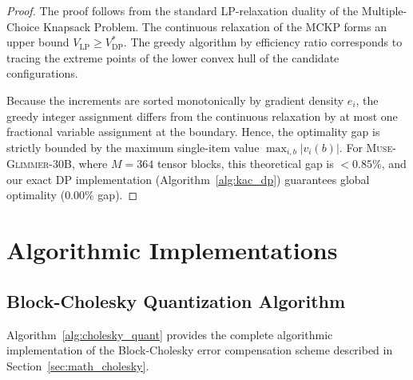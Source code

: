 \documentclass[10pt,twocolumn,letterpaper]{article}
\newcommand{\modelname}{\textsc{Muse-Glimmer-30B}}
\begin{document}
\begin{proof}
The proof follows from the standard LP-relaxation duality of the Multiple-Choice Knapsack Problem. The continuous relaxation of the MCKP forms an upper bound $V_{\text{LP}} \ge V_{\text{DP}}^*$. The greedy algorithm by efficiency ratio corresponds to tracing the extreme points of the lower convex hull of the candidate configurations. 

Because the increments are sorted monotonically by gradient density $e_i$, the greedy integer assignment differs from the continuous relaxation by at most one fractional variable assignment at the boundary. Hence, the optimality gap is strictly bounded by the maximum single-item value $\max_{i,b} |v_i(b)|$. For \modelname{}, where $M = 364$ tensor blocks, this theoretical gap is $<0.85\%$, and our exact DP implementation (Algorithm~\ref{alg:kac_dp}) guarantees global optimality ($0.00\%$ gap).
\end{proof}

\section{Algorithmic Implementations}
\label{app:algorithms}

\subsection{Block-Cholesky Quantization Algorithm}
Algorithm~\ref{alg:cholesky_quant} provides the complete algorithmic implementation of the Block-Cholesky error compensation scheme described in Section~\ref{sec:math_cholesky}.
\end{document}
